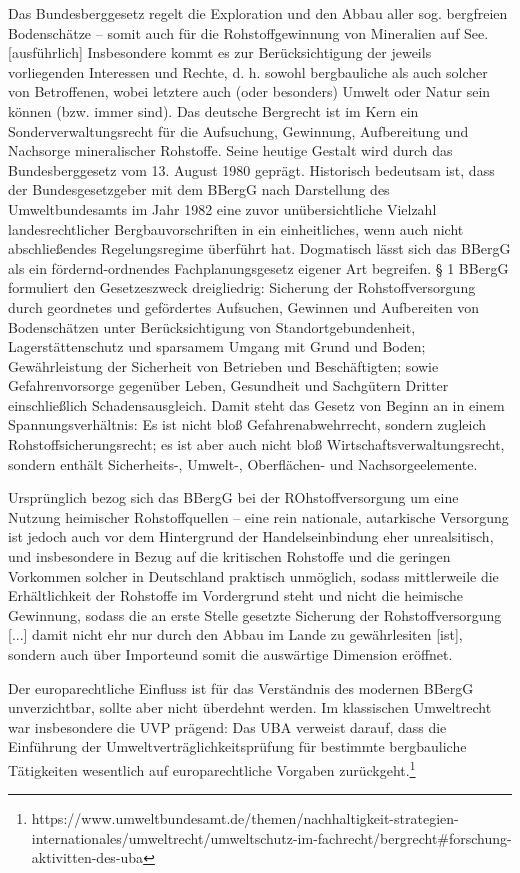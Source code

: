 \documentclass[12pt,a4paper,oneside]{book} %
\begin{document}
Das Bundesberggesetz regelt die Exploration und den Abbau aller sog. bergfreien Bodenschätze -- somit auch für die Rohstoffgewinnung von Mineralien auf See.[ausführlich]\autocite{Jenisch II} Insbesondere kommt es zur Berücksichtigung der jeweils vorliegenden Interessen und Rechte, d. h. sowohl bergbauliche als auch solcher von Betroffenen, wobei letztere auch (oder besonders) Umwelt oder Natur sein können (bzw. immer sind). Das deutsche Bergrecht ist im Kern ein Sonderverwaltungsrecht für die Aufsuchung, Gewinnung, Aufbereitung und Nachsorge mineralischer Rohstoffe. Seine heutige Gestalt wird durch das Bundesberggesetz vom 13. August 1980 geprägt. Historisch bedeutsam ist, dass der Bundesgesetzgeber mit dem BBergG nach Darstellung des Umweltbundesamts im Jahr 1982 eine zuvor unübersichtliche Vielzahl landesrechtlicher Bergbauvorschriften in ein einheitliches, wenn auch nicht abschließendes Regelungsregime überführt hat. Dogmatisch lässt sich das BBergG als ein fördernd-ordnendes Fachplanungsgesetz eigener Art begreifen. § 1 BBergG formuliert den Gesetzeszweck dreigliedrig: Sicherung der Rohstoffversorgung durch geordnetes und gefördertes Aufsuchen, Gewinnen und Aufbereiten von Bodenschätzen unter Berücksichtigung von Standortgebundenheit, Lagerstättenschutz und sparsamem Umgang mit Grund und Boden; Gewährleistung der Sicherheit von Betrieben und Beschäftigten; sowie Gefahrenvorsorge gegenüber Leben, Gesundheit und Sachgütern Dritter einschließlich Schadensausgleich. Damit steht das Gesetz von Beginn an in einem Spannungsverhältnis: Es ist nicht bloß Gefahrenabwehrrecht, sondern zugleich Rohstoffsicherungsrecht; es ist aber auch nicht bloß Wirtschaftsverwaltungsrecht, sondern enthält Sicherheits-, Umwelt-, Oberflächen- und Nachsorgeelemente.

Ursprünglich bezog sich das BBergG bei der ROhstoffversorgung um eine Nutzung heimischer Rohstoffquellen -- eine rein nationale, autarkische Versorgung ist jedoch auch vor dem Hintergrund der Handelseinbindung eher unrealsitisch, und insbesondere in Bezug auf die kritischen Rohstoffe und die geringen Vorkommen solcher in Deutschland \glqq praktisch unmöglich\grqq, sodass mittlerweile die Erhältlichkeit der Rohstoffe im Vordergrund steht und nicht die heimische Gewinnung, sodass die \glqq an erste Stelle gesetzte Sicherung der Rohstoffversorgung [...] damit nicht ehr nur durch den Abbau im Lande zu gewährlesiten [ist], sondern auch über Importe\grqq und somit die auswärtige Dimension eröffnet.\autocite{Frenz 2025, S. 1037-1038.}

Der europarechtliche Einfluss ist für das Verständnis des modernen BBergG unverzichtbar, sollte aber nicht überdehnt werden. Im klassischen Umweltrecht war insbesondere die UVP prägend: Das UBA verweist darauf, dass die Einführung der Umweltverträglichkeitsprüfung für bestimmte bergbauliche Tätigkeiten wesentlich auf europarechtliche Vorgaben zurückgeht.\footnote{https://www.umweltbundesamt.de/themen/nachhaltigkeit-strategien-internationales/umweltrecht/umweltschutz-im-fachrecht/bergrecht#forschung-aktivitten-des-uba}
\end{document}
